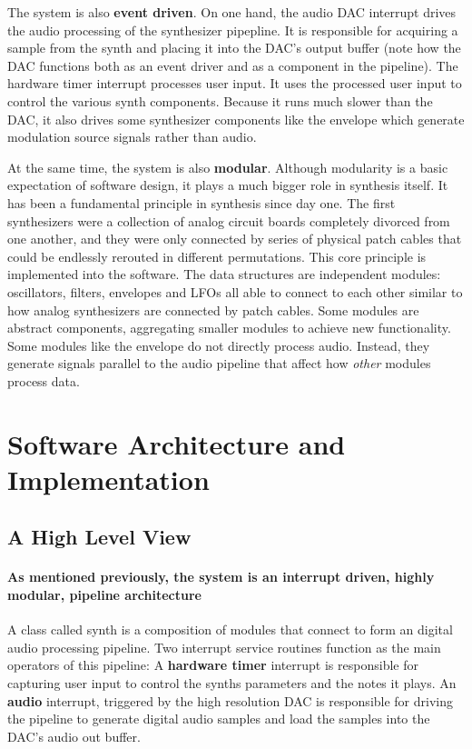 \documentclass[acmlarge,screen]{acmart}
\begin{document}
	
	The system is also \textbf{event driven}. On one hand, the audio DAC interrupt drives the audio processing of the synthesizer pipepline. It is responsible for acquiring a sample from the synth and placing it into the DAC's output buffer (note how the DAC functions both as an event driver and as a component in the pipeline). The hardware timer interrupt processes user input. It uses the processed user input to control the various synth components. Because it runs much slower than the DAC, it also drives some synthesizer components like the envelope which generate modulation source signals rather than audio.
	
	At the same time, the system is also \textbf{modular}. Although modularity is a basic expectation of software design, it plays a much bigger role in synthesis itself. It has been a fundamental principle in synthesis since day one. The first synthesizers were a collection of analog circuit boards completely divorced from one another, and they were only connected by series of physical patch cables that could be endlessly rerouted in different permutations. This core principle is implemented into the software. The data structures are independent modules: oscillators, filters, envelopes and LFOs all able to connect to each other similar to how analog synthesizers are connected by patch cables. Some modules are abstract components, aggregating smaller modules to achieve new functionality. Some modules like the envelope do not directly process audio. Instead, they generate signals parallel to the audio pipeline that affect how \textit{other} modules process data.

\section{Software Architecture and Implementation}

\subsection{A High Level View}
	\paragraph{As mentioned previously, the system is an interrupt driven, highly modular, pipeline architecture} A class called synth is a composition of modules that connect to form an digital audio processing pipeline. Two interrupt service routines function as the main operators of this pipeline: A \textbf{hardware timer} interrupt is responsible for capturing user input to control the synths parameters and the notes it plays. An \textbf{audio} interrupt, triggered by the high resolution DAC is responsible for driving the pipeline to generate digital audio samples and load the samples into the DAC's audio out buffer.
	
\end{document}
